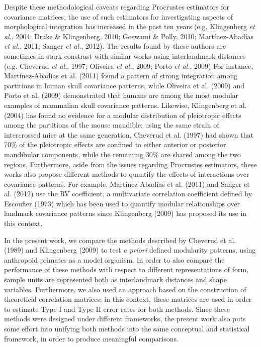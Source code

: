 \documentclass[12pt,]{article}
\begin{document}
Despite these methodological caveats regarding Procrustes estimators for
covariance matrices, the use of such estimators for investigating
aspects of morphological integration has increased in the past ten years
(e.g. Klingenberg \emph{et al.}, 2004; Drake \& Klingenberg, 2010;
Goswami \& Polly, 2010; Martínez-Abadías \emph{et al.}, 2011; Sanger
\emph{et al.}, 2012). The results found by these authors are sometimes
in stark constrast with similar works using interlandmark distances
(e.g. Cheverud \emph{et al.}, 1997; Oliveira \emph{et al.}, 2009; Porto
\emph{et al.}, 2009) For instance, Martínez-Abadías et al. (2011) found
a pattern of strong integration among partitions in human skull
covariance patterns, while Oliveira et al. (2009) and Porto et al.
(2009) demonstrated that humans are among the most modular examples of
mammalian skull covariance patterns. Likewise, Klingenberg et al. (2004)
has found no evidence for a modular distribution of pleiotropic effects
among the partitions of the mouse mandible; using the same strain of
intercrossed mice at the same generation, Cheverud et al. (1997) had
shown that 70\% of the pleiotropic effects are confined to either
anterior or posterior mandibular components, while the remaining 30\%
are shared among the two regions. Furthermore, aside from the issues
regarding Procrustes estimators, these works also propose different
methods to quantify the effects of interactions over covariance
patterns. For example, Martínez-Abadías et al. (2011) and Sanger et al.
(2012) use the RV coefficient, a multivariate correlation coefficient
defined by Escoufier (1973) which has been used to quantify modular
relationships over landmark covariance patterns since Klingenberg (2009)
has proposed its use in this context.

In the present work, we compare the methods described by Cheverud et al.
(1989) and Klingenberg (2009) to test \emph{a priori} defined modularity
patterns, using anthropoid primates as a model organism. In order to
also compare the performance of these methods with respect to different
representations of form, sample units are represented both as
interlandmark distances and shape variables. Furthermore, we also used
an approach based on the construction of theoretical correlation
matrices; in this context, these matrices are used in order to estimate
Type I and Type II error rates for both methods. Since these methods
were designed under different frameworks, the present work also puts
some effort into unifying both methods into the same conceptual and
statistical framework, in order to produce meaningful comparisons.
\end{document}
